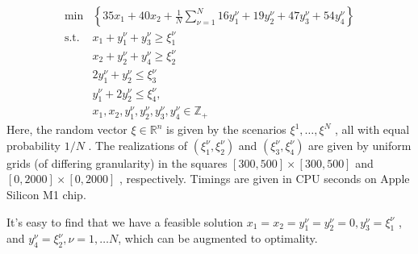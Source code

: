 \documentclass{article}
\theoremstyle{plain}
\theoremstyle{definition}
\begin{document}
\begin{propsition}
\begin{align*}
\min & \left\{35 x_{1}+40 x_{2}+\frac{1}{N} \sum_{\nu=1}^{N} 16 y_{1}^{\nu}+19 y_{2}^{\nu}+47 y_{3}^{\nu}+54 y_{4}^{\nu}\right\} \\
\text{s.t. }  & x_{1}+y_{1}^{\nu}+y_{3}^{\nu}  \geq \xi_{1}^{\nu} \\
& x_{2}+y_{2}^{\nu}+y_{4}^{\nu}  \geq \xi_{2}^{\nu} \\
& 2 y_{1}^{\nu}+y_{2}^{\nu}  \leq \xi_{3}^{\nu} \\
& y_{1}^{\nu}+2 y_{2}^{\nu}  \leq \xi_{4}^{\nu}, \\
& x_{1}, x_{2}, y_{1}^{\nu}, y_{2}^{\nu}, y_{3}^{\nu}, y_{4}^{\nu}  \in \mathbb{Z}_{+}
\end{align*}
Here, the random vector  $\xi \in \mathbb{R}^{n}$  is given by the scenarios  $\xi^{1}, \ldots, \xi^{N}$ , all with equal probability  $1 / N$ . The realizations of  $\left(\xi_{1}^{\nu}, \xi_{2}^{\nu}\right) $ and  $\left(\xi_{3}^{\nu}, \xi_{4}^{\nu}\right)$  are given by uniform grids (of differing granularity) in the squares $ [300,500] \times[300,500]$  and  $[0,2000] \times[0,2000]$ , respectively. Timings are given in CPU seconds on Apple Silicon M1 chip.

It's easy to find that we have a  feasible solution  $x_{1}=x_{2}=y_{1}^{\nu}=y_{2}^{\nu}=0, y_{3}^{\nu}=\xi_{1}^{\nu}$ , and  $y_{4}^{\nu}=\xi_{2}^{\nu}, \nu=1, \ldots N$, which can be augmented  to optimality.


\end{propsition}
\end{document}

